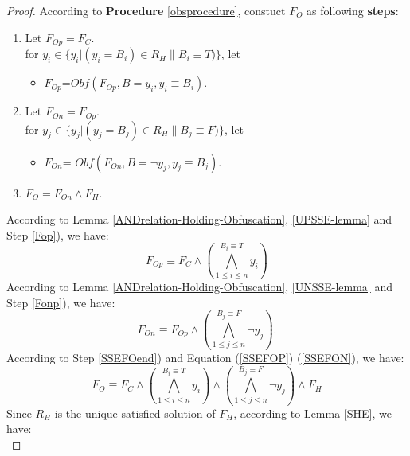 \documentclass[conference]{IEEEtran}
\begin{document}
\begin{proof}
According to \textbf{Procedure} \ref{obsprocedure}, constuct $F_O$ as following \textbf{steps}:
\begin{enumerate}
\item \label{Fop}  
Let $F_{Op}=F_C$.  \\
for $y_i \in \{y_i|(y_i=B_{i})\in R_H \parallel B_i\equiv T)\}$, let
\begin{itemize}
 \item[] $F_{Op}$=$Obf(F_{Op},B=y_i,{y_i\equiv B_i})$. 
\end{itemize}
\item  \label{Fonp}
Let $F_{On}=F_{Op}$. \\
for $y_j \in \{y_j|(y_j=B_j)\in R_H \parallel B_j\equiv F)\}$, let
\begin{itemize}
 \item[] $F_{On}$= $Obf(F_{On},B=\neg y_j,{y_j\equiv B_j})$.
\end{itemize}
\item  \label{SSEFOend}
$F_{O}=F_{On}\wedge F_H$.
\end{enumerate}
According to Lemma \ref{ANDrelation-Holding-Obfuscation}, \ref{UPSSE-lemma} and Step \ref{Fop}), we have:
\begin{equation}\label{SSEFOP}
F_{Op} \equiv F_C\wedge (\bigwedge_{1\leqslant i\leqslant n}^{B_i \equiv T}y_i) 
\end{equation}
According to Lemma \ref{ANDrelation-Holding-Obfuscation}, \ref{UNSSE-lemma} and Step \ref{Fonp}), we have:
\begin{equation}\label{SSEFON}
F_{On} \equiv F_{Op}\wedge (\bigwedge_{1\leqslant j\leqslant n}^{B_j \equiv F}\neg y_j). 
\end{equation}
According to Step \ref{SSEFOend}) and Equation (\ref{SSEFOP}) (\ref{SSEFON}), we have: 
\begin{equation}\label{SSEFO}
F_{O} \equiv F_C \wedge 
(\bigwedge_{1\leqslant i\leqslant n}^{B_i \equiv T}y_i)\wedge
(\bigwedge_{1\leqslant j\leqslant n}^{B_j \equiv F}\neg y_j) \wedge F_H
\end{equation}
Since ${R_H}$ is the unique satisfied solution of $F_H$,
according to Lemma \ref{SHE}, we have: 
\begin{equation}\label{SSEFH}

\end{equation}
\end{proof}
\end{document}
